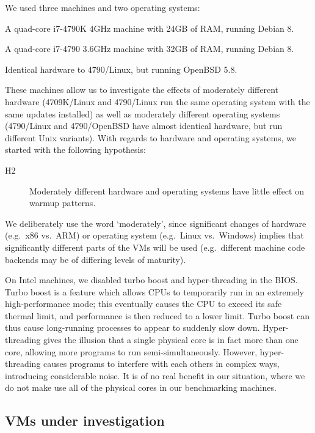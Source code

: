 \documentclass[10pt,preprint]{sigplanconf}
\newcommand{\hyptwo}{H2\xspace}
\newcommand{\bencherthree}{4709K/Linux\xspace}
\newcommand{\bencherfive}{4790/Linux\xspace}
\newcommand{\benchersix}{4790/OpenBSD\xspace}
\begin{document}
We used three machines and two operating systems:
\begin{description*}
  \item[\bencherthree] A quad-core i7-4790K 4GHz machine with 24GB of RAM, running Debian 8.
  \item[\bencherfive] A quad-core i7-4790 3.6GHz machine with 32GB of RAM, running Debian 8.
  \item[\benchersix] Identical hardware to \bencherfive, but running OpenBSD 5.8.
\end{description*}
These machines allow us to investigate the effects of moderately different
hardware (\bencherthree and \bencherfive run the same operating system with the
same updates installed) as well as moderately different operating systems
(\bencherfive and \benchersix have almost identical hardware, but run different
Unix
variants). With regards to hardware and operating systems, we started with the
following hypothesis:
\begin{description}
  \item[\hyptwo] Moderately different hardware and operating systems have little effect on warmup patterns.
\end{description}
We deliberately use the word `moderately', since significant changes of hardware
(e.g.~x86 vs.~ARM) or operating system (e.g.~Linux vs.~Windows) implies that
significantly different parts of the VMs will be used (e.g.~different machine
code backends may be of differing levels of maturity).

On Intel machines, we disabled turbo boost and hyper-threading in the BIOS. Turbo boost is a
feature which allows CPUs to temporarily run in an extremely high-performance
mode; this eventually causes the CPU to exceed its safe thermal limit, and
performance is then reduced to a lower limit. Turbo boost can thus cause long-running processes to
appear to suddenly slow down. Hyper-threading gives the illusion that a single
physical core is in fact more than one core, allowing more programs to
run semi-simultaneously. However, hyper-threading causes programs to interfere
with each others in complex ways, introducing considerable noise. It
is of no real benefit in our situation, where we do not make use all of the
physical cores in our benchmarking machines.


\subsection{VMs under investigation}
\end{document}
